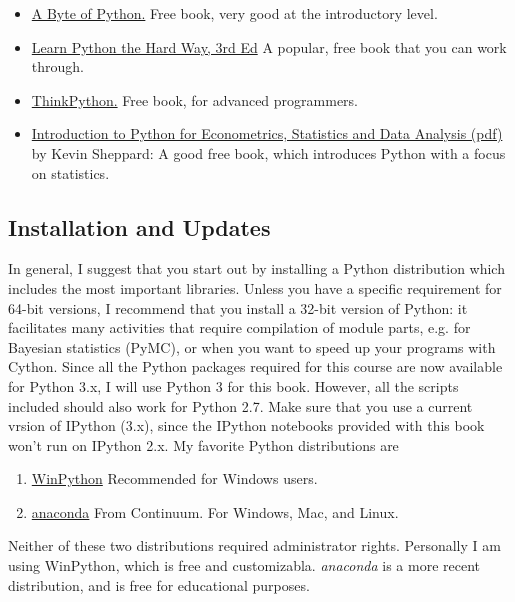 \begin{itemize}
  \item \href{http://swaroopch.com/notes/python}{A Byte of Python.} Free book, very good at the introductory level.
  \item \href{http://learnpythonthehardway.org/book/}{Learn Python the Hard Way, 3rd Ed} A popular, free book that you can work through.
  \item \href{http://www.greenteapress.com/thinkpython}{ThinkPython.} Free book, for advanced programmers.
  \item \href{http://www.kevinsheppard.com/images/0/09/Python_introduction.pdf}{Introduction to
      Python for Econometrics, Statistics and Data Analysis (pdf)} by Kevin Sheppard: A
      good free book, which introduces Python with a focus on statistics.
\end{itemize}

\subsection{Installation and Updates}

In general, I suggest that you start out by installing a Python distribution which includes the most important libraries. Unless you have a specific requirement for 64-bit versions, I recommend that you install a 32-bit version of Python: it facilitates many activities that require compilation of module parts, e.g. for Bayesian statistics (PyMC), or when you want to speed up your programs with Cython. Since all the Python packages required for this course are now available for Python 3.x, I will use Python 3 for this book. However, all the scripts included should also work for Python 2.7. Make sure that you use a current vrsion of IPython (3.x), since the IPython notebooks provided with this book won't run on IPython 2.x. My favorite Python distributions  are

\begin{enumerate}
    \item \href{https://winpython.github.io/}{WinPython} Recommended for Windows users.
    \item \href{https://store.continuum.io/cshop/anaconda/}{anaconda} From Continuum. For Windows, Mac, and Linux.
\end{enumerate}

Neither of these two distributions required administrator rights. Personally I am using WinPython, which is free and customizabla. \emph{anaconda} is a more recent distribution, and is free for educational purposes.

